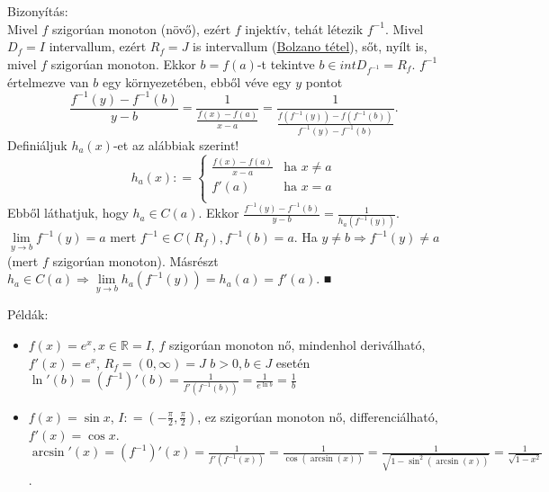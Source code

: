 \documentclass[12pt,a4paper]{scrartcl}
\providecommand{\tightlist}{%
  \setlength{\itemsep}{0pt}\setlength{\parskip}{0pt}}
\newenvironment{bizonyitas}{}{}
\newenvironment{pelda}{}{}
\begin{document}
\begin{bizonyitas}

Bizonyítás:\\
Mivel \(f\) szigorúan monoton (növő), ezért \(f\) injektív, tehát
létezik \(f^{- 1}\). Mivel \(D_{f} = I\) intervallum, ezért
\(R_{f} = J\) is intervallum (\protect\hyperlink{bolzanotetel}{Bolzano
tétel}), sőt, nyílt is, mivel \(f\) szigorúan monoton. Ekkor
\(b = f\left( a \right)\)-t tekintve \(b \in {int}D_{f^{- 1}} = R_{f}\).
\(f^{- 1}\) értelmezve van \(b\) egy környezetében, ebből véve egy \(y\)
pontot
\[\frac{f^{- 1}\left( y \right) - f^{- 1}\left( b \right)}{y - b} = \frac{1}{\frac{f\left( x \right) - f\left( a \right)}{x - a}} = \frac{1}{\frac{f\left( {f^{- 1}\left( y \right)} \right) - f\left( {f^{- 1}\left( b \right)} \right)}{f^{- 1}\left( y \right) - f^{- 1}\left( b \right)}}.\]
Definiáljuk \(h_{a}\left( x \right)\)-et az alábbiak szerint!
\[h_{a}\left( x \right): = \begin{cases}
\frac{f\left( x \right) - f\left( a \right)}{x - a} & {\text{ha~}x \neq a} \\
{f'\left( a \right)} & {\text{ha~}x = a} \\
\end{cases}\] Ebből láthatjuk, hogy \(h_{a} \in C\left( a \right)\).
Ekkor
\(\frac{f^{- 1}\left( y \right) - f^{- 1}\left( b \right)}{y - b} = \frac{1}{h_{a}\left( {f^{- 1}\left( y \right)} \right)}\).
\(\underset{y\rightarrow b}{\lim}f^{- 1}\left( y \right) = a\) mert
\(f^{- 1} \in C\left( R_{f} \right),f^{- 1}\left( b \right) = a\). Ha
\(\left. y \neq b\Rightarrow f^{- 1}\left( y \right) \neq a \right.\)
(mert \(f\) szigorúan monoton). Másrészt
\(\left. h_{a} \in C\left( a \right)\Rightarrow\underset{y\rightarrow b}{\lim}h_{a}\left( {f^{- 1}\left( y \right)} \right) = h_{a}\left( a \right) = f'\left( a \right) \right.\).
■

\end{bizonyitas}

\begin{pelda}

Példák:

\begin{itemize}
\tightlist
\item
  \(f\left( x \right) = e^{x},x \in {\mathbb{R}} = I\), \(f\) szigorúan
  monoton nő, mindenhol deriválható, \(f'\left( x \right) = e^{x}\),
  \(R_{f} = \left( {0,\infty} \right) = J\) \(b > 0,b \in J\) esetén
  \(\ln'\left( b \right) = \left( f^{- 1} \right)'\left( b \right) = \frac{1}{f'\left( {f^{- 1}\left( b \right)} \right)} = \frac{1}{e^{\ln b}} = \frac{1}{b}\)
\item
  \(f\left( x \right) = \sin x\),
  \(I: = \left( {- \frac{\pi}{2},\frac{\pi}{2}} \right)\), ez szigorúan
  monoton nő, differenciálható, \(f'\left( x \right) = \cos x\).
  \(\arcsin'\left( x \right) = \left( f^{- 1} \right)'\left( x \right) = \frac{1}{f'\left( {f^{- 1}\left( x \right)} \right)} = \frac{1}{\cos\left( {\arcsin\left( x \right)} \right)} = \frac{1}{\sqrt{1 - \sin^{2}\left( {\arcsin\left( x \right)} \right)}} = \frac{1}{\sqrt{1 - x^{2}}}\).
\end{itemize}

\end{pelda}
\end{document}
